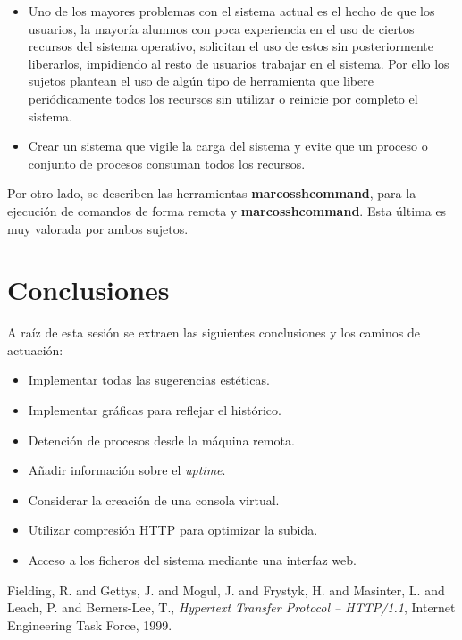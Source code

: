 	\begin{itemize}
		\item Uno de los mayores problemas con el sistema actual es el hecho de que los usuarios, la mayoría alumnos con poca experiencia en el uso de ciertos recursos del sistema operativo, solicitan el uso de estos sin posteriormente liberarlos, impidiendo al resto de usuarios trabajar en el sistema. Por ello los sujetos plantean el uso de algún tipo de herramienta que libere periódicamente todos los recursos sin utilizar o reinicie por completo el sistema.

		\item Crear un sistema que vigile la carga del sistema y evite que un proceso o conjunto de procesos consuman todos los recursos.
	\end{itemize}

Por otro lado, se describen las herramientas \textbf{marcosshcommand}, para la ejecución de comandos de forma remota y \textbf{marcosshcommand}. Esta última es muy valorada por ambos sujetos.

\section{Conclusiones}

A raíz de esta sesión se extraen las siguientes conclusiones y los caminos de actuación:

\begin{itemize}
	\item Implementar todas las sugerencias estéticas.
	\item Implementar gráficas para reflejar el histórico.
	\item Detención de procesos desde la máquina remota.
	\item Añadir información sobre el \textit{uptime}.
	\item Considerar la creación de una consola virtual.
	\item Utilizar compresión HTTP para optimizar la subida\cite{rfc2616}.
	\item Acceso a los ficheros del sistema mediante una interfaz web.
\end{itemize}

\begin{thebibliography}{9}

  {Fielding, R. and Gettys, J. and Mogul, J. and Frystyk, H. and Masinter, L. and Leach, P. and Berners-Lee, T.},
  \emph{Hypertext Transfer Protocol – HTTP/1.1},
  Internet Engineering Task Force,
  1999.

\end{thebibliography}

